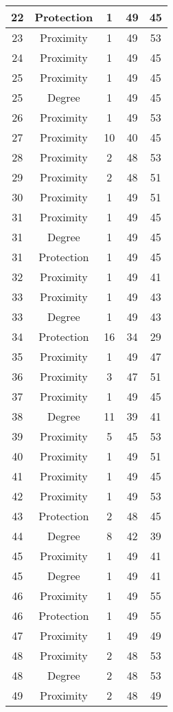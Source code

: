 \documentclass[results.tex]{subfiles}
\begin{document}
\begin{center}
\begin{tabular}{| c || c | c | c | c |}
    \hline
    22 & Protection & 1 & 49 & 45 \\ 
    \hline
    23 & Proximity & 1 & 49 & 53 \\ 
    \hline
    24 & Proximity & 1 & 49 & 45 \\ 
    \hline
    25 & Proximity & 1 & 49 & 45 \\ 
    \hline
    25 & Degree & 1 & 49 & 45 \\ 
    \hline
    26 & Proximity & 1 & 49 & 53 \\ 
    \hline
    27 & Proximity & 10 & 40 & 45 \\ 
    \hline
    28 & Proximity & 2 & 48 & 53 \\ 
    \hline
    29 & Proximity & 2 & 48 & 51 \\ 
    \hline
    30 & Proximity & 1 & 49 & 51 \\ 
    \hline
    31 & Proximity & 1 & 49 & 45 \\ 
    \hline
    31 & Degree & 1 & 49 & 45 \\ 
    \hline
    31 & Protection & 1 & 49 & 45 \\ 
    \hline
    32 & Proximity & 1 & 49 & 41 \\ 
    \hline
    33 & Proximity & 1 & 49 & 43 \\ 
    \hline
    33 & Degree & 1 & 49 & 43 \\ 
    \hline
    34 & Protection & 16 & 34 & 29 \\ 
    \hline
    35 & Proximity & 1 & 49 & 47 \\ 
    \hline
    36 & Proximity & 3 & 47 & 51 \\ 
    \hline
    37 & Proximity & 1 & 49 & 45 \\ 
    \hline
    38 & Degree & 11 & 39 & 41 \\ 
    \hline
    39 & Proximity & 5 & 45 & 53 \\ 
    \hline
    40 & Proximity & 1 & 49 & 51 \\ 
    \hline
    41 & Proximity & 1 & 49 & 45 \\ 
    \hline
    42 & Proximity & 1 & 49 & 53 \\ 
    \hline
    43 & Protection & 2 & 48 & 45 \\ 
    \hline
    44 & Degree & 8 & 42 & 39 \\ 
    \hline
    45 & Proximity & 1 & 49 & 41 \\ 
    \hline
    45 & Degree & 1 & 49 & 41 \\ 
    \hline
    46 & Proximity & 1 & 49 & 55 \\ 
    \hline
    46 & Protection & 1 & 49 & 55 \\ 
    \hline
    47 & Proximity & 1 & 49 & 49 \\ 
    \hline
    48 & Proximity & 2 & 48 & 53 \\ 
    \hline
    48 & Degree & 2 & 48 & 53 \\ 
    \hline
    49 & Proximity & 2 & 48 & 49 \\ 
    \hline   \end{tabular}
\end{center}
\end{document}
